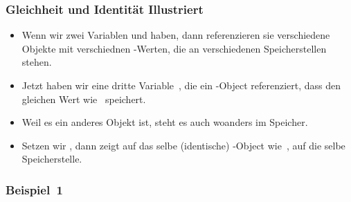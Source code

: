 \documentclass[aspectratio=169,mathserif,notheorems]{beamer}%
\begin{document}
\begin{frame}[b]%
\frametitle{Gleichheit und Identität Illustriert}%
%
%
%
\begin{itemize}%
%
\item Wenn wir zwei Variablen  und  haben, dann referenzieren sie verschiedene Objekte mit verschiednen -Werten, die an verschiedenen Speicherstellen stehen.%
%
\item<2-> Jetzt haben wir eine dritte Variable~, die ein -Object referenziert, dass den gleichen Wert wie~ speichert.%
\item<3-> Weil es ein anderes Objekt ist, steht es auch woanders im Speicher.%
%
\item<4-> Setzen wir , dann zeigt  auf das selbe (identische) -Object wie~, auf die selbe Speicherstelle.%
%
\end{itemize}%
%
\end{frame}%
%
\begin{frame}%
\frametitle{Beispiel~1}%
%
%
%
%
\end{frame}%
%
\end{document}
